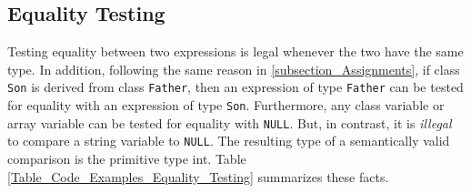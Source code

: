 \documentclass{article}
\begin{document}
\subsection{Equality Testing}
\label{subsection_Equality_Testing}
Testing equality between two expressions is legal whenever the two have the same type.
In addition, following the same reason in \ref{subsection_Assignments},
if class \verb"Son" is derived from class \verb"Father",
then an expression  of type \verb"Father" can be
tested for equality with an expression of type \verb"Son".
Furthermore, any class variable or array variable can be tested for equality with \verb"NULL".
But, in contrast, it is \textit{illegal} to compare a string variable to \verb"NULL".
The resulting type of a semantically valid comparison is the primitive type int.
Table \ref{Table_Code_Examples_Equality_Testing} summarizes these facts.
\end{document}
